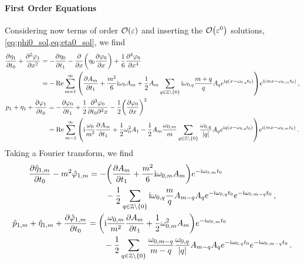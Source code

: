 \documentclass{jfm}
\newcommand{\im}{\mathrm{i}}
\renewcommand*{\epsilon}{\varepsilon}
\begin{document}
\paragraph{First Order Equations}
Considering now terms of order $\order{\epsilon}$ and inserting the
$\order{\epsilon^0}$ solutions, \cref{eq:phi0_sol,eq:eta0_sol}, we find
\begin{gather}
  \begin{aligned}
    \pdv{\eta_1}{t_0} + \pdv[2]{\varphi_{1}}{x} &=
      -\pdv{\eta_0}{t_1} - \pdv{x} \pqty{\eta_0 \pdv{\varphi_0}{x}} +
      \frac{1}{6} \pdv[4]{\varphi_0}{x} \\
    &= -\Re \sum_{m=1}^{\infty} \pqty{ \pdv{A_m}{t_1} + \frac{m^2}{6}
      \im \omega_0 A_m
      + \frac{1}{2} A_m \sum_{q \in \mathbb{Z} \setminus \{0\}}
      \im \omega_{0,q} \frac{m+q}{q} A_q e^{\im q (x-\omega_{0,q} t_0)}
      } e^{\im (m x-\omega_{0,m} t_0)}
    \,,
  \end{aligned}
  \\
  \begin{aligned}
    p_1 + \eta_1 + \pdv{\varphi_1}{t_0} &= - \pdv{\varphi_0}{t_1}
      + \frac{1}{2} \frac{\partial^3 \varphi_0}{\partial t_0 \partial^2 x}
      - \frac{1}{2} \pqty{ \pdv{\varphi_0}{x} }^2 \\
    &= \Re \sum_{m=1}^{\infty} \pqty{\im \frac{\omega_0}{m^2}
      \pdv{A_m}{t_1} + \frac{1}{2} \omega_0^2 A_1
      -\frac{1}{2} A_m \frac{\omega_{0,m}}{m} \sum_{q \in \mathbb{Z}
      \setminus \{0\}} \frac{\omega_{0,q}}{\abs{q}} A_q e^{\im q (x -
      \omega_{0,q} t_0)}
      } e^{\im (m x-\omega_{0,m} t_0)}
    \,.
  \end{aligned}
\end{gather}
Taking a Fourier transform, we find
\begin{gather}
  \begin{aligned}
  \pdv{\hat{\eta}_{1,m}}{t_0} - m^2 \hat{\varphi}_{1,m}
  &= -\pqty{ \pdv{A_m}{t_1} + \frac{m^2}{6}
      \im \omega_{0,m} A_m
      } e^{-\im \omega_{0,m} t_0} \\
  &\qquad
      - \frac{1}{2} \sum_{q \in \mathbb{Z} \setminus \{0\}}
      \im \omega_{0,q} \frac{m}{q} A_{m-q}
      A_q e^{-\im \omega_{0,q} t_0} e^{-\im \omega_{0,m-q} t_0}
    \,,
  \end{aligned}
  \\
  \begin{aligned}
  \hat{p}_{1,m} + \hat{\eta}_{1,m} + \pdv{\hat{\varphi}_{1,m}}{t_0}
  &= \pqty{\im \frac{\omega_{0,m}}{m^2}
    \pdv{A_m}{t_1} + \frac{1}{2} \omega_{0,m}^2 A_m
      } e^{-\im \omega_{0,m} t_0} \\
  &\qquad
      -\frac{1}{2} \sum_{q \in \mathbb{Z} \setminus \{0\}}
      \frac{\omega_{0,m-q}}{m-q} \frac{\omega_{0,q}}{\abs{q}} A_{m-q}
      A_q e^{-\im \omega_{0,q} t_0}  e^{-\im \omega_{0,m-q} t_0}
    \,.
  \end{aligned}
\end{gather}
\end{document}

